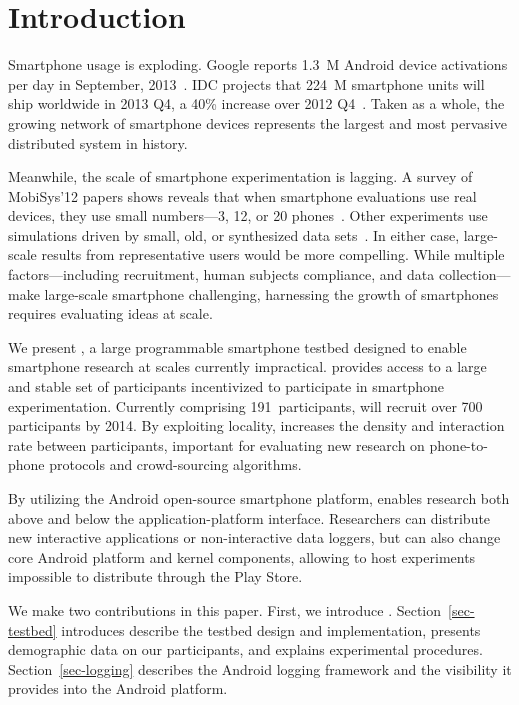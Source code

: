 \section{Introduction}
\label{sec-introduction}

Smartphone usage is exploding. Google reports 1.3~M Android device activations
per day in September, 2013~\cite{google-Sep2012-activations}. IDC projects that
224~M smartphone units will ship worldwide in 2013 Q4, a 40\% increase over
2012 Q4~\cite{idc-smartphone-growth}. Taken as a whole, the growing network of
smartphone devices represents the largest and most pervasive distributed system
in history.

Meanwhile, the scale of smartphone experimentation is lagging. A survey of
MobiSys'12 papers shows reveals that when smartphone evaluations use real
devices, they use small numbers---3, 12, or 20
phones~\cite{nowar-mobisys12,comon-mobisys12,caching-mobisys12}. Other
experiments use simulations driven by small, old, or synthesized data
sets~\cite{falcon-mobisys12,ace-mobisys12,humanmobility-mobisys12}. In either
case, large-scale results from representative users would be more compelling.
While multiple factors---including recruitment, human subjects compliance,
and data collection---make large-scale smartphone challenging, harnessing the
growth of smartphones requires evaluating ideas at scale.

We present \PhoneLab{}, a large programmable smartphone testbed designed to
enable smartphone research at scales currently impractical. \PhoneLab{}
provides access to a large and stable set of participants incentivized to
participate in smartphone experimentation. Currently comprising
191~participants, \PhoneLab{} will recruit over 700 participants by 2014. By
exploiting locality, \PhoneLab{} increases the density and interaction rate
between participants, important for evaluating new research on phone-to-phone
protocols and crowd-sourcing algorithms.

By utilizing the Android open-source smartphone platform, \PhoneLab{} enables
research both above and below the application-platform interface. Researchers
can distribute new interactive applications or non-interactive data loggers,
but can also change core Android platform and kernel components, allowing
\PhoneLab{} to host experiments impossible to distribute through the Play
Store.

We make two contributions in this paper. First, we introduce \PhoneLab{}.
Section~\ref{sec-testbed} introduces describe the testbed design and
implementation, presents demographic data on our participants, and explains
experimental procedures. Section~\ref{sec-logging} describes the Android
logging framework and the visibility it provides into the Android platform.

